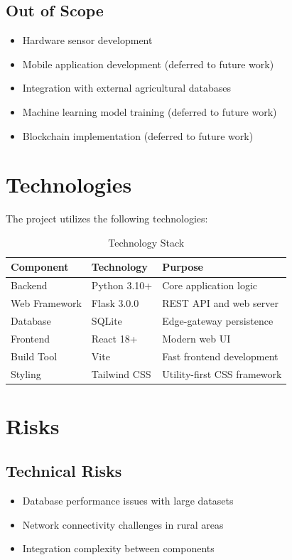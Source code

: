 \subsection{Out of Scope}
\begin{itemize}
    \item Hardware sensor development
    \item Mobile application development (deferred to future work)
    \item Integration with external agricultural databases
    \item Machine learning model training (deferred to future work)
    \item Blockchain implementation (deferred to future work)
\end{itemize}

\section{Technologies}

The project utilizes the following technologies:

\begin{table}[H]
\centering
\begin{tabular}{|l|l|l|}
\hline
\textbf{Component} & \textbf{Technology} & \textbf{Purpose} \\
\hline
Backend & Python 3.10+ & Core application logic \\
Web Framework & Flask 3.0.0 & REST API and web server \\
Database & SQLite & Edge-gateway persistence \\
Frontend & React 18+ & Modern web UI \\
Build Tool & Vite & Fast frontend development \\
Styling & Tailwind CSS & Utility-first CSS framework \\
\hline
\end{tabular}
\caption{Technology Stack}
\end{table}

\section{Risks}

\subsection{Technical Risks}
\begin{itemize}
    \item Database performance issues with large datasets
    \item Network connectivity challenges in rural areas
    \item Integration complexity between components
\end{itemize}

